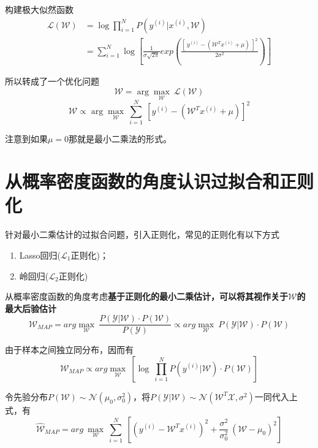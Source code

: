 构建极大似然函数
\begin{equation}
    \begin{aligned}
        \mathcal{L}(\mathcal{W})&=\log\prod_{i=1}^{N}P(y^{(i)}|x^{(i)},\mathcal{W})\\
        &=\sum_{i=1}^{N}\log\left[ \frac{1}{\sigma\sqrt{2\pi}}exp\left( \frac{[\ y^{(i)}-(\mathcal{W}^Tx^{(i)}+\mu) \ ]^2}{2\sigma^2} \right) \right]
    \end{aligned}
\end{equation}

所以转成了一个优化问题
\begin{equation}
    \mathcal{W}=\arg\max\limits_{\mathcal{W}}\ \mathcal{L}(\mathcal{W})
\end{equation}
\begin{equation}
    \mathcal{W}\propto \arg\max\limits_{\mathcal{W}}\ \sum_{i=1}^{N}\ \left[ y^{(i)}-(\mathcal{W}^Tx^{(i)}+\mu) \right]^2
\end{equation}

注意到如果$\mu=0$那就是最小二乘法的形式。

\section{从概率密度函数的角度认识过拟合和正则化}

针对最小二乘估计的过拟合问题，引入正则化，常见的正则化有以下方式
\begin{enumerate}[itemindent=2em]
    \item Lasso回归($\mathcal{L}_1$正则化)；
    \item 岭回归($\mathcal{L}_2$正则化)
\end{enumerate}

从概率密度函数的角度考虑\textbf{基于正则化的最小二乘估计，可以将其视作关于$\mathcal{W}$的最大后验估计}
\begin{equation}
    \mathcal{W}_{MAP}=arg\max_{\mathcal{W}}\ \frac{P(\mathcal{Y}|\mathcal{W})\cdot P(\mathcal{W})}{P(\mathcal{Y})}\propto arg\max_{\mathcal{W}}\  P(\mathcal{Y}|\mathcal{W})\cdot P(\mathcal{W})
\end{equation}

由于样本之间独立同分布，因而有
\begin{equation}
    \mathcal{W}_{MAP}\propto arg\max_{\mathcal{W}}\  \left[ \log\ \prod\limits_{i=1}^{N}P(y^{(i)}|\mathcal{W})\cdot P(\mathcal{W}) \right]
\end{equation}

令先验分布$P(\mathcal{W})\sim \mathcal{N}(\mu_0,\sigma^2_0)$，将$P(\mathcal{Y}|\mathcal{W})\sim \mathcal{N}(\mathcal{W}^T\mathcal{X},\sigma^2)$一同代入上式，有
\begin{equation}
    \hat{\mathcal{W}}_{MAP}=arg\ \max\limits_{\mathcal{W}}\ \sum\limits_{i=1}^{N}\ \left[ (y^{(i)}-\mathcal{W}^T x^{(i)})^2+\frac{\sigma^2}{\sigma^2_0}\  (\mathcal{W}-\mu_0)^2 \right]
\end{equation}


